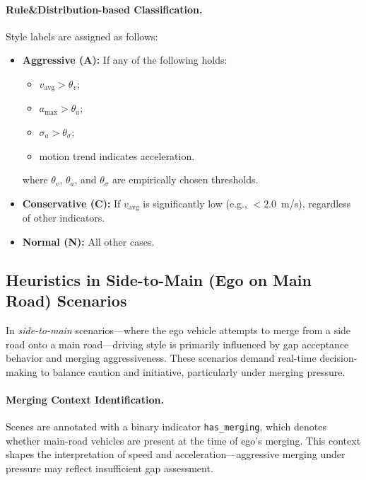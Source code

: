 \documentclass{article}
\begin{document}
\paragraph{Rule\&Distribution-based Classification.}
Style labels are assigned as follows:
\begin{itemize}[leftmargin=1em, topsep=0pt, itemsep=0.3em]
    \item \textbf{Aggressive (A):} If any of the following holds:
    \begin{itemize}
        \item $v_{\text{avg}} > \theta_v$;
        \item $a_{\max} > \theta_a$;
        \item $\sigma_a > \theta_\sigma$;
        \item motion trend indicates acceleration.
    \end{itemize}
    where $\theta_v$, $\theta_a$, and $\theta_\sigma$ are empirically chosen thresholds.
    
    \item \textbf{Conservative (C):} If $v_{\text{avg}}$ is significantly low (e.g., $< 2.0$~m/s), regardless of other indicators.
    
    \item \textbf{Normal (N):} All other cases.
\end{itemize}


\subsection{Heuristics in Side-to-Main (Ego on Main Road) Scenarios}

In \textit{side-to-main} scenarios—where the ego vehicle attempts to merge from a side road onto a main road—driving style is primarily influenced by gap acceptance behavior and merging aggressiveness. These scenarios demand real-time decision-making to balance caution and initiative, particularly under merging pressure.

\paragraph{Merging Context Identification.}
Scenes are annotated with a binary indicator \texttt{has\_merging}, which denotes whether main-road vehicles are present at the time of ego’s merging. This context shapes the interpretation of speed and acceleration—aggressive merging under pressure may reflect insufficient gap assessment.
\end{document}
